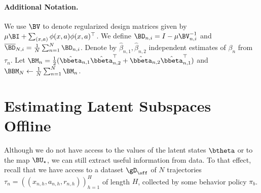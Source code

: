 \paragraph{Additional Notation.} We use $\BV$ to denote regularized design matrices given by $\mu \BI + \sum_{(x,a)} \phi(x,a)\phi(x,a)^\top$. We define $\BD_{n,i} = I - \mu \BV_{n,i}^{-1}$ and $\overline{\BD}_{N,i} = \frac{1}{N} \sum_{n=1}^N \BD_{n,i}$. Denote by $\hat \beta_{n,1}, \hat \beta_{n,2}$ independent estimates of $\beta_n$ from $\tau_n$. Let $\BM_n = \frac{1}{2}(\hat \bbeta_{n,1} \hat \bbeta_{n,2}^\top + \hat \bbeta_{n,2} \hat \bbeta_{n,1}^\top)$ and $\BBM_N \gets \frac{1}{N}\sum_{n=1}^N \BM_n$.
 
\section{Estimating Latent Subspaces Offline}\label{sec:subspace-est}

Although we do not have access to the values of the latent states $\btheta$ or to the map $\BU_\star$, we can still extract useful information from data. To that effect, recall that we have access to a dataset $\gD_{\off}$ of $N$ trajectories $\tau_n = ((x_{n,h}, a_{n,h}, r_{n,h}))_{h=1}^H$ of length $H$, collected by some behavior policy $\pi_b$. 

 
